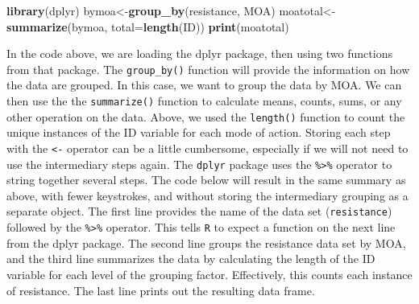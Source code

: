 \documentclass[letterpaper,]{book}
\newenvironment{Shaded}{\begin{snugshade}}{\end{snugshade}}
\newcommand{\DataTypeTok}[1]{\textcolor[rgb]{0.13,0.29,0.53}{#1}}
\newcommand{\KeywordTok}[1]{\textcolor[rgb]{0.13,0.29,0.53}{\textbf{#1}}}
\newcommand{\NormalTok}[1]{#1}
\newcommand{\OperatorTok}[1]{\textcolor[rgb]{0.81,0.36,0.00}{\textbf{#1}}}
\newcommand{\StringTok}[1]{\textcolor[rgb]{0.31,0.60,0.02}{#1}}
\begin{document}
\begin{Shaded}
\begin{Highlighting}[]
\KeywordTok{library}\NormalTok{(dplyr)}
\NormalTok{bymoa<-}\KeywordTok{group_by}\NormalTok{(resistance, MOA)}
\NormalTok{moatotal<-}\KeywordTok{summarize}\NormalTok{(bymoa, }\DataTypeTok{total=}\KeywordTok{length}\NormalTok{(ID))}
\KeywordTok{print}\NormalTok{(moatotal)}
\end{Highlighting}
\end{Shaded}

In the code above, we are loading the dplyr package, then using two functions from that package. The \texttt{group\_by()} function will provide the information on how the data are grouped. In this case, we want to group the data by MOA. We can then use the the \texttt{summarize()} function to calculate means, counts, sums, or any other operation on the data. Above, we used the \texttt{length()} function to count the unique instances of the ID variable for each mode of action. Storing each step with the \texttt{\textless{}-} operator can be a little cumbersome, especially if we will not need to use the intermediary steps again. The \texttt{dplyr} package uses the \texttt{\%\textgreater{}\%} operator to string together several steps. The code below will result in the same summary as above, with fewer keystrokes, and without storing the intermediary grouping as a separate object. The first line provides the name of the data set (\texttt{resistance}) followed by the \texttt{\%\textgreater{}\%} operator. This tells \texttt{R} to expect a function on the next line from the dplyr package. The second line groups the resistance data set by MOA, and the third line summarizes the data by calculating the length of the ID variable for each level of the grouping factor. Effectively, this counts each instance of resistance. The last line prints out the resulting data frame.

\begin{Shaded}
\end{Shaded}
\end{document}
